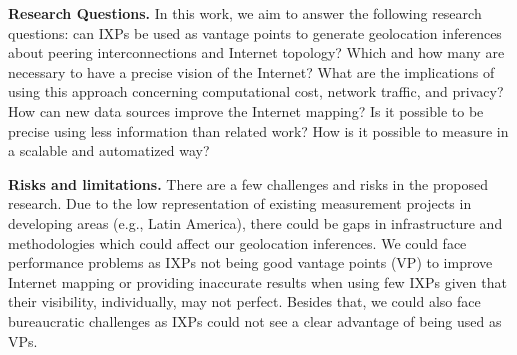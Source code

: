 


	\textbf{Research Questions.} In this work, we aim to answer the following research questions: can IXPs be used as vantage points to generate geolocation inferences about peering interconnections and Internet topology? Which and how many are necessary to have a precise vision of the Internet? What are the implications of using this approach concerning computational cost, network traffic, and privacy? How can new data sources improve the Internet mapping? Is it possible to be precise using less information than related work? How is it possible to measure in a scalable and automatized way?

	\textbf{Risks and limitations.} There are a few challenges and risks in the proposed research. Due to the low representation of existing measurement projects in developing areas (e.g., Latin America), there could be gaps in infrastructure and methodologies which could affect our geolocation inferences. We could face performance problems as IXPs not being good vantage points (VP) to improve Internet mapping or providing inaccurate results when using few IXPs given that their visibility, individually, may not perfect. Besides that, we could also face bureaucratic challenges as IXPs could not see a clear advantage of being used as VPs.
